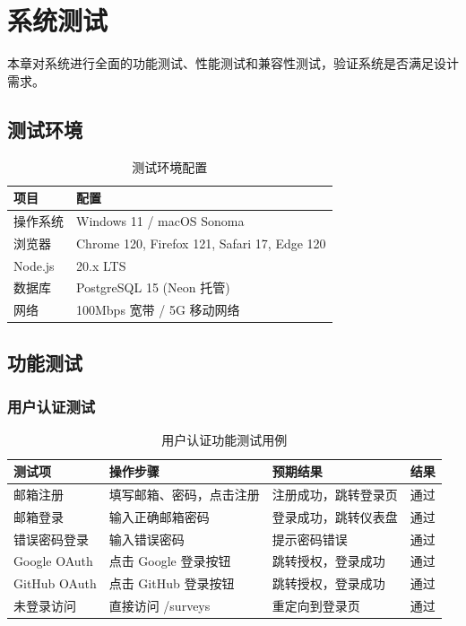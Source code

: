 \section{系统测试}

本章对系统进行全面的功能测试、性能测试和兼容性测试，验证系统是否满足设计需求。

\subsection{测试环境}

\begin{table}[H]
\centering
\caption{测试环境配置}
\label{tab:test-env}
\begin{tabular}{ll}
\toprule
\textbf{项目} & \textbf{配置} \\
\midrule
操作系统 & Windows 11 / macOS Sonoma \\
浏览器 & Chrome 120, Firefox 121, Safari 17, Edge 120 \\
Node.js & 20.x LTS \\
数据库 & PostgreSQL 15 (Neon 托管) \\
网络 & 100Mbps 宽带 / 5G 移动网络 \\
\bottomrule
\end{tabular}
\end{table}

\subsection{功能测试}

\subsubsection{用户认证测试}

\begin{table}[H]
\centering
\caption{用户认证功能测试用例}
\label{tab:auth-test}
\begin{tabular}{p{3cm}p{4cm}p{3cm}p{2cm}}
\toprule
\textbf{测试项} & \textbf{操作步骤} & \textbf{预期结果} & \textbf{结果} \\
\midrule
邮箱注册 & 填写邮箱、密码，点击注册 & 注册成功，跳转登录页 & 通过 \\
邮箱登录 & 输入正确邮箱密码 & 登录成功，跳转仪表盘 & 通过 \\
错误密码登录 & 输入错误密码 & 提示密码错误 & 通过 \\
Google OAuth & 点击 Google 登录按钮 & 跳转授权，登录成功 & 通过 \\
GitHub OAuth & 点击 GitHub 登录按钮 & 跳转授权，登录成功 & 通过 \\
未登录访问 & 直接访问 /surveys & 重定向到登录页 & 通过 \\
\bottomrule
\end{tabular}
\end{table}

